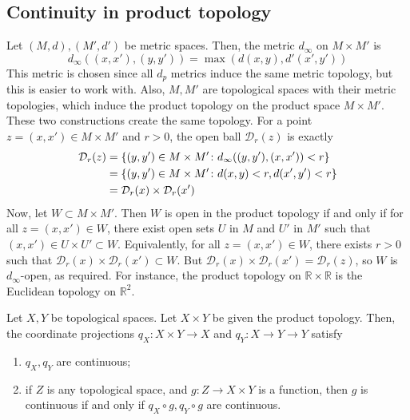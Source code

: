 \subsection{Continuity in product topology}
\begin{example}
	Let \( (M, d), (M', d') \) be metric spaces.
	Then, the metric \( d_\infty \) on \( M \times M' \) is
	\[
		d_\infty((x,x'), (y,y')) = \max(d(x,y), d'(x',y'))
	\]
	This metric is chosen since all \( d_p \) metrics induce the same metric topology, but this is easier to work with.
	Also, \( M, M' \) are topological spaces with their metric topologies, which induce the product topology on the product space \( M \times M' \).
	These two constructions create the same topology.
	For a point \( z = (x,x') \in M \times M' \) and \( r > 0 \), the open ball \( \mathcal D_r(z) \) is exactly\
	\begin{align*}
		\mathcal D_r(z) & = \qty{(y,y') \in M \times M' \colon d_\infty((y,y'), (x,x')) < r} \\
		                & = \qty{(y,y') \in M \times M' \colon d(x,y) < r, d(x',y') < r}     \\
		                & = \mathcal D_r(x) \times \mathcal D_r(x')
	\end{align*}
	Now, let \( W \subset M \times M' \).
	Then \( W \) is open in the product topology if and only if for all \( z = (x,x') \in W \), there exist open sets \( U \) in \( M \) and \( U' \) in \( M' \) such that \( (x,x') \in U \times U' \subset W \).
	Equivalently, for all \( z = (x,x') \in W \), there exists \( r > 0 \) such that \( \mathcal D_r(x) \times \mathcal D_r(x') \subset W \).
	But \( \mathcal D_r(x) \times \mathcal D_r(x') = \mathcal D_r(z) \), so \( W \) is \( d_\infty \)-open, as required.
	For instance, the product topology on \( \mathbb R \times \mathbb R \) is the Euclidean topology on \( \mathbb R^2 \).
\end{example}
\begin{proposition}
	Let \( X, Y \) be topological spaces.
	Let \( X \times Y \) be given the product topology.
	Then, the coordinate projections \( q_X \colon X \times Y \to X \) and \( q_Y \colon X \to Y \to Y \) satisfy
	\begin{enumerate}
		\item \( q_X, q_Y \) are continuous;
		\item if \( Z \) is any topological space, and \( g \colon Z \to X \times Y \) is a function, then \( g \) is continuous if and only if \( q_X \circ g, q_Y \circ g \) are continuous.
	\end{enumerate}
\end{proposition}
